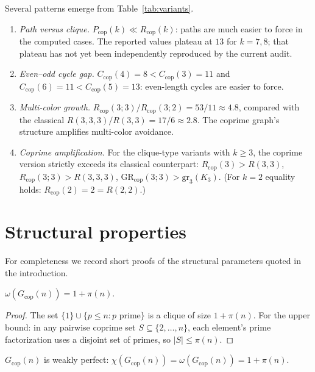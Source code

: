 \documentclass[12pt]{article}
\newcommand{\Rcop}{R_{\mathrm{cop}}}
\newcommand{\Pcop}{P_{\mathrm{cop}}}
\newcommand{\Ccop}{C_{\mathrm{cop}}}
\newcommand{\GRcop}{\mathrm{GR}_{\mathrm{cop}}}
\newcommand{\Gcop}{G_{\mathrm{cop}}}
\begin{document}
\begin{remark}\label{rem:observations}
Several patterns emerge from Table~\ref{tab:variants}.
\begin{enumerate}
\item \emph{Path versus clique.} $\Pcop(k)\ll\Rcop(k)$: paths are much
  easier to force in the computed cases. The reported values plateau
  at $13$ for $k=7,8$; that plateau has not yet been independently
  reproduced by the current audit.
\item \emph{Even--odd cycle gap.} $\Ccop(4)=8<\Ccop(3)=11$ and
  $\Ccop(6)=11<\Ccop(5)=13$: even-length cycles are easier to force.
\item \emph{Multi-color growth.}
  $\Rcop(3;3)/\Rcop(3;2)=53/11\approx 4.8$, compared with the
  classical $R(3,3,3)/R(3,3)=17/6\approx 2.8$. The coprime graph's
  structure amplifies multi-color avoidance.
\item \emph{Coprime amplification.} For the clique-type variants
  with $k \ge 3$, the coprime version strictly exceeds its classical
  counterpart: $\Rcop(3)>R(3,3)$, $\Rcop(3;3)>R(3,3,3)$,
  $\GRcop(3;3)>\mathrm{gr}_3(K_3)$. (For $k = 2$ equality holds:
  $\Rcop(2) = 2 = R(2,2)$.)
\end{enumerate}
\end{remark}

\section{Structural properties}\label{sec:structure}

For completeness we record short proofs of the structural parameters
quoted in the introduction.

\begin{proposition}\label{prop:clique}
$\omega(\Gcop(n))=1+\pi(n)$.
\end{proposition}

\begin{proof}
The set $\{1\}\cup\{p\le n:p\text{ prime}\}$ is a clique of size
$1+\pi(n)$. For the upper bound: in any pairwise coprime set
$S\subseteq\{2,\ldots,n\}$, each element's prime factorization uses a
disjoint set of primes, so $|S|\le\pi(n)$.
\end{proof}

\begin{proposition}\label{prop:perfect}
$\Gcop(n)$ is weakly perfect: $\chi(\Gcop(n))=\omega(\Gcop(n))
=1+\pi(n)$.
\end{proposition}
\end{document}
